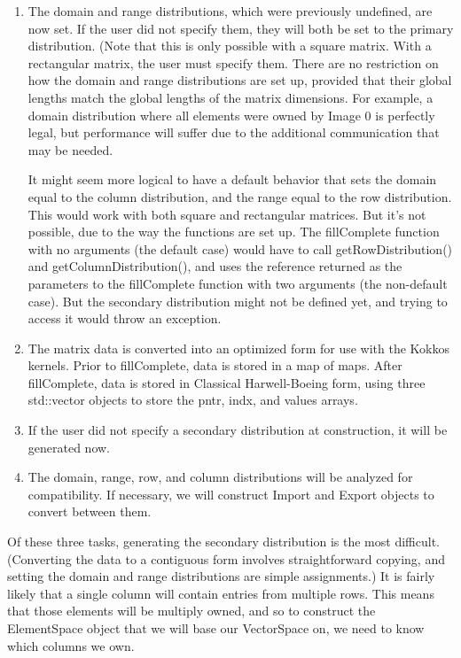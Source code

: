 \documentclass[10pt,relax]{TpetraDesign}
\begin{document}
\begin{enumerate}
\item The domain and range distributions, which were previously undefined, are now set. If the user did not specify them, they will both be set to the primary distribution. (Note that this is only possible with a square matrix. With a rectangular matrix, the user must specify them. There are no restriction on how the domain and range distributions are set up, provided that their global lengths match the global lengths of the matrix dimensions. For example, a domain distribution where all elements were owned by Image 0 is perfectly legal, but performance will suffer due to the additional communication that may be needed.

It might seem more logical to have a default behavior that sets the domain equal to the column distribution, and the range equal to the row distribution. This would work with both square and rectangular matrices. But it's not possible, due to the way the functions are set up. The fillComplete function with no arguments (the default case) would have to call getRowDistribution() and getColumnDistribution(), and uses the reference returned as the parameters to the fillComplete function with two arguments (the non-default case). But the secondary distribution might not be defined yet, and trying to access it would throw an exception.

\item The matrix data is converted into an optimized form for use with the Kokkos kernels. Prior to fillComplete, data is stored in a map of maps. After fillComplete, data is stored in Classical Harwell-Boeing form, using three std::vector objects to store the pntr, indx, and values arrays.

\item If the user did not specify a secondary distribution at construction, it will be generated now.

\item The domain, range, row, and column distributions will be analyzed for compatibility. If necessary, we will construct Import and Export objects to convert between them.
\end{enumerate}

Of these three tasks, generating the secondary distribution is the most difficult. (Converting the data to a contiguous form involves straightforward copying, and setting the domain and range distributions are simple assignments.) It is fairly likely that a single column will contain entries from multiple rows. This means that those elements will be multiply owned, and so to construct the ElementSpace object that we will base our VectorSpace on, we need to know which columns we own. 
\end{document}

